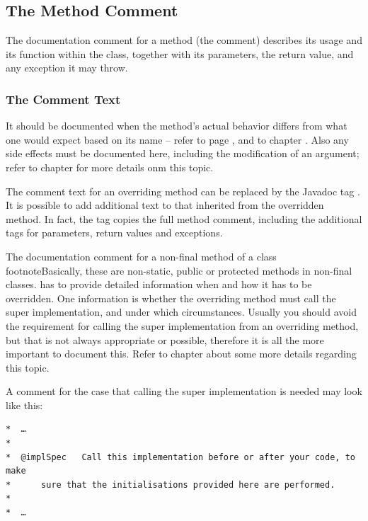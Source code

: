 \subsection{The Method Comment}\label{sec:MethodComment}
The documentation comment for a method (the  comment) describes its usage and its function within the class, together with its parameters, the return value, and any exception it may throw.


\subsubsection{The Comment Text}
It should be documented when the method's actual behavior differs from what one would expect based on its name – refer to page \pageref{princ:NamingConventions:NamesAsContract}, and to chapter . Also any side effects must be documented here, including the modification of an argument; refer to chapter  for more details onm this topic.

The comment text for an overriding method can be replaced by the Javadoc tag . It is possible to add additional text to that inherited from the overridden method. In fact, the tag  copies the full method comment, including the additional tags for parameters, return values and exceptions.

The documentation comment for a non-final method of a class\\footnote{Basically, these are non-static, public or protected methods in non-final classes.} has to provide detailed information when and how it has to be overridden. One information is whether the overriding method must call the super implementation, and under which circumstances. Usually you should avoid the requirement for calling the super implementation from an overriding method, but that is not always appropriate or possible, therefore it is all the more important to document this. Refer to chapter  about some more details regarding this topic. 

A comment for the case that calling the super implementation is needed may look like this:
\begin{lstlisting}[language=Comment]
*  …
*
*  @implSpec   Call this implementation before or after your code, to make
*      sure that the initialisations provided here are performed.
*
*  …
\end{lstlisting}


